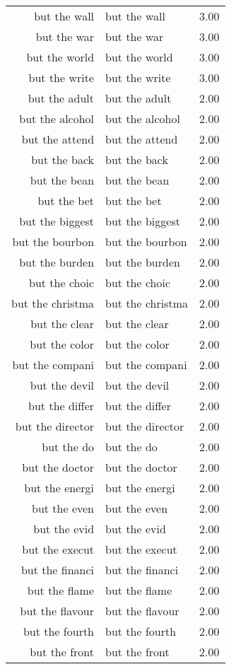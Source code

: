 \begin{table}[ht]
\begin{tabular}{rlr}
  but the wall & but the wall & 3.00 \\ 
  but the war & but the war & 3.00 \\ 
  but the world & but the world & 3.00 \\ 
  but the write & but the write & 3.00 \\ 
  but the adult & but the adult & 2.00 \\ 
  but the alcohol & but the alcohol & 2.00 \\ 
  but the attend & but the attend & 2.00 \\ 
  but the back & but the back & 2.00 \\ 
  but the bean & but the bean & 2.00 \\ 
  but the bet & but the bet & 2.00 \\ 
  but the biggest & but the biggest & 2.00 \\ 
  but the bourbon & but the bourbon & 2.00 \\ 
  but the burden & but the burden & 2.00 \\ 
  but the choic & but the choic & 2.00 \\ 
  but the christma & but the christma & 2.00 \\ 
  but the clear & but the clear & 2.00 \\ 
  but the color & but the color & 2.00 \\ 
  but the compani & but the compani & 2.00 \\ 
  but the devil & but the devil & 2.00 \\ 
  but the differ & but the differ & 2.00 \\ 
  but the director & but the director & 2.00 \\ 
  but the do & but the do & 2.00 \\ 
  but the doctor & but the doctor & 2.00 \\ 
  but the energi & but the energi & 2.00 \\ 
  but the even & but the even & 2.00 \\ 
  but the evid & but the evid & 2.00 \\ 
  but the execut & but the execut & 2.00 \\ 
  but the financi & but the financi & 2.00 \\ 
  but the flame & but the flame & 2.00 \\ 
  but the flavour & but the flavour & 2.00 \\ 
  but the fourth & but the fourth & 2.00 \\ 
  but the front & but the front & 2.00 \\ 

\end{tabular}
\end{table}
